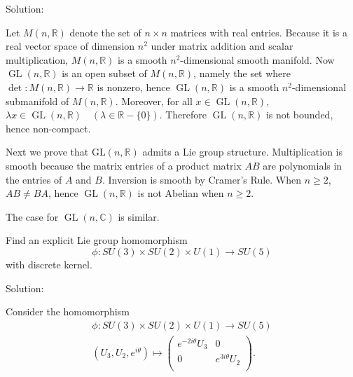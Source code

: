 Solution:

Let $M(n,\mathbb{R})$ denote the set of $n\times n$ matrices with real entries.
Because it is a real vector space of dimension $n^2$ under matrix
addition and scalar multiplication, $M(n,\mathbb{R})$ is a
smooth $n^2$-dimensional smooth manifold. Now $\operatorname{GL}(n,\mathbb{R})$
is an open subset of $M(n,\mathbb{R})$, namely the set where
$\operatorname{det}: M(n,\mathbb{R})\to \mathbb{R}$ is nonzero, 
hence $\operatorname{GL}(n,\mathbb{R})$ is a smooth $n^2$-dimensional submanifold 
of $M(n,\mathbb{R})$. Moreover, for all $x\in \operatorname{GL}(n,\mathbb{R})$, 
$\lambda x \in \operatorname{GL}(n,\mathbb{R})\quad (\lambda \in \mathbb{R}-\{0\})$. 
Therefore $\operatorname{GL}(n,\mathbb{R})$ is not bounded, hence non-compact.

Next we prove that $\mathrm{GL}(n,\mathbb{R})$ admits a Lie group structure. 
Multiplication is smooth because the matrix entries of a product matrix
$AB$ are polynomials in the entries of $A$ and $B$. 
Inversion is smooth by Cramer's Rule. When $n\ge 2$, $AB\neq BA$, 
hence $\operatorname{GL}(n,\mathbb{R})$ is not Abelian when $n\geq 2$.

The case for $\operatorname{GL}(n,\mathbb{C})$ is similar.

\begin{exercise}
    Find an explicit Lie group homomorphism
    \begin{equation*}
        \phi: SU(3)\times SU(2)\times U(1)\to SU(5)
    \end{equation*}
    with discrete kernel.
\end{exercise}

Solution:

Consider the homomorphism
\begin{align}
    \phi :SU(3)\times SU(2)\times U(1)\to SU(5) \\
    (U_3,U_2,e^{i\theta})\mapsto 
        \left( 
            \begin{matrix}
	            e^{-2i\theta}U_3&		0\\
	            0&		e^{3i\theta}U_2\\
            \end{matrix} 
        \right).
\end{align}

